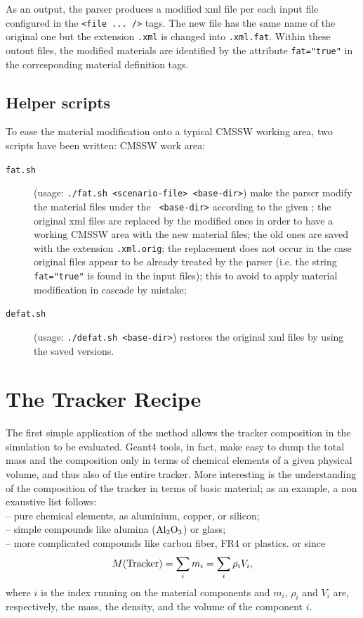 \documentclass{cmspaper}
\begin{document}
As an output, the parser produces a modified xml file per each input
file configured in the {\tt <file ... />} tags. The new file has the
same name of the original one but the extension {\tt .xml} is changed
into {\tt .xml.fat}. Within these outout files, the modified materials
are identified by the attribute {\tt fat="true"} in the corresponding
material definition tags.

\subsection{Helper scripts}

To ease the material modification onto a typical CMSSW working area, two scripts have been written:
CMSSW work area:
\begin{description}
\item[{\tt fat.sh}] (usage: {\tt ./fat.sh <scenario-file> <base-dir>})
  make the parser modify the material files under the {\tt
    <base-dir>} according to the given {\tt <scenario-file>}; the
  original xml files are replaced by the modified ones in order to
  have a working CMSSW area with the new material files; the old ones
  are saved with the extension {\tt .xml.orig}; the replacement does
  not occur in the case original files appear to be already treated by
  the parser (i.e. the string {\tt fat="true"} is found in the input
  files); this to avoid to apply material modification in cascade by mistake;
\item[{\tt defat.sh}] (usage: {\tt ./defat.sh <base-dir>}) restores
  the original xml files by using the saved versions. 
\end{description}

\section{The Tracker Recipe}

The first simple application of the method allows the tracker
composition in the simulation to be evaluated. Geant4 tools, in fact, 
make easy to dump the total mass and the composition only in terms of
chemical elements of a given physical volume, and thus also of
the entire tracker. More interesting is the understanding of the composition of
the tracker in terms of basic material; as an example, a non exaustive list follows:\\
-- pure chemical elements, as aluminium, copper, or silicon;\\
-- simple compounds like alumina (${\rm Al}_2{\rm O}_3$) or glass;\\
-- more complicated compounds like carbon fiber, FR4 or plastics. 
or  since
\begin{equation}
M({\rm Tracker}) = \sum_i m_i = \sum_i \rho_i V_i,
\end{equation}
where $i$ is the index running on the material components and $m_i$,
$\rho_i$ and $V_i$ are, respectively, the mass, the density, and the
volume of the component $i$.
\end{document}
